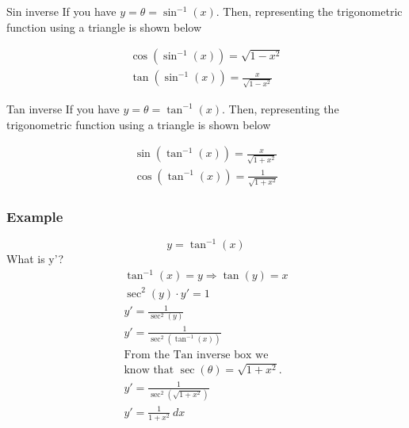 \documentclass[letterpaper,10pt,twoside,twocolumn,openany]{book}
\begin{document}
\begin{commentbox}{Sin inverse}
    If you have
    $
        y = \theta = \sin^{-1}(x)
    $.
    Then, representing the trigonometric function using a triangle is shown below\\
    \begin{gather}
        \cos(\sin^{-1}(x)) = \sqrt{1 - x^2}\\
        \tan(\sin^{-1}(x)) = \frac{x}{\sqrt{1 - x^2}}
    \end{gather}
\end{commentbox}

\begin{commentbox}{Tan inverse}
    If you have
    $
        y = \theta = \tan^{-1}(x)
    $.
    Then, representing the trigonometric function using a triangle is shown below\\
    \begin{gather}
        \sin(\tan^{-1}(x)) = \frac{x}{\sqrt{1 + x^2}}\\
        \cos(\tan^{-1}(x)) = \frac{1}{\sqrt{1 + x^2}}
    \end{gather}
\end{commentbox}

\newpage

\subsubsection{Example}
$$ 
    y = \tan^{-1}(x) 
$$
What is y'?
\begin{gather*}
    \tan^{-1}(x) = y \Rightarrow \tan(y) = x\\ 
    \sec^2(y)\cdot y' = 1\\ 
    y' = \frac{1}{\sec^2(y)}\\ 
    y' = \frac{1}{\sec^2(\tan^{-1}(x))}\\
    \text{From the Tan inverse box we}\\ 
    \text{know that $\sec(\theta) = \sqrt{1 + x^2}$.}\\ 
    y' = \frac{1}{\sec^2(\sqrt{1 + x^2})}\\ 
    y' = \frac{1}{1 + x^2}\ dx
\end{gather*}
\end{document}
